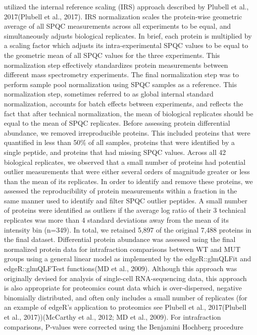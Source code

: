 utilized the internal reference scaling (IRS) approach described by Plubell et
al., 2017(Plubell et al., 2017). IRS normalization scales the protein-wise
geometric average of all SPQC measurements across all experiments to be equal,
and simultaneously adjusts biological replicates. In brief, each protein is
multiplied by a scaling factor which adjusts its intra-experimental SPQC values
to be equal to the geometric mean of all SPQC values for the three experiments.
This normalization step effectively standardizes protein measurements between
different mass spectrometry experiments. 
The final normalization step was to perform sample pool normalization using SPQC
samples as a reference. This normalization step, sometimes referred to as global
internal standard normalization, accounts for batch effects between experiments,
and reflects the fact that after technical normalization, the mean of biological
replicates should be equal to the mean of SPQC replicates.
Before assessing protein differential abundance, we removed irreproducible
proteins. This included proteins that were quantified in less than 50\% of all
samples, proteins that were identified by a single peptide, and proteins that
had missing SPQC values. Across all 42 biological replicates, we observed that a
small number of proteins had potential outlier measurements that were either
several orders of magnitude greater or less than the mean of its replicates. In
order to identify and remove these proteins, we assessed the reproducibility of
protein measurements within a fraction in the same manner used to identify and
filter SPQC outlier peptides. A small number of proteins were identified as
outliers if the average log ratio of their 3 technical replicates was more than
4 standard deviations away from the mean of its intensity bin (n=349). In total,
we retained 5,897 of the original 7,488 proteins in the final dataset. 
Differential protein abundance was assessed using the final normalized protein
data for intrafraction comparisons between WT and MUT groups using a general
linear model as implemented by the edgeR::glmQLFit and edgeR::glmQLFTest
functions(MD et al., 2009). Although this approach was originally devised for
analysis of single-cell RNA-sequencing data, this approach is also appropriate
for proteomics count data which is over-dispersed, negative binomially
distributed, and often only includes a small number of replicates (for an
example of edgeR’s application to proteomics see Plubell et al., 2017(Plubell et
al., 2017))(McCarthy et al., 2012; MD et al., 2009). For intrafraction
comparisons, P-values were corrected using the Benjamini Hochberg procedure
